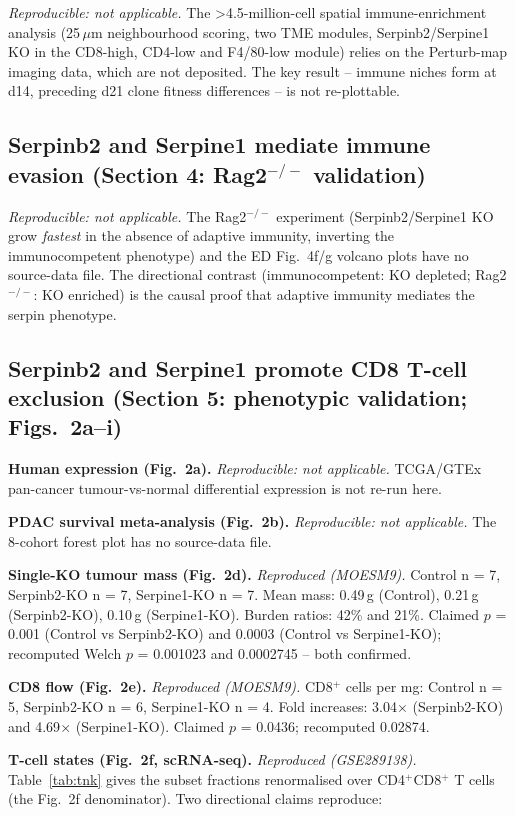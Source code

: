 \documentclass[preprint,12pt]{elsarticle}
\begin{document}
\emph{Reproducible: not applicable.} The >4.5-million-cell spatial
immune-enrichment analysis (25\,$\mu$m neighbourhood scoring, two
TME modules, Serpinb2/Serpine1 KO in the
CD8-high, CD4-low and F4/80-low module) relies on the Perturb-map
imaging data, which are not deposited. The key result -- immune
niches form at d14, preceding d21 clone fitness differences -- is
not re-plottable.

\subsection{Serpinb2 and Serpine1 mediate immune evasion
(Section 4: Rag2$^{-/-}$ validation)}

\emph{Reproducible: not applicable.} The Rag2$^{-/-}$ experiment
(Serpinb2/Serpine1 KO grow \emph{fastest} in the absence of
adaptive immunity, inverting the immunocompetent phenotype) and the
ED Fig.~4f/g volcano plots have no source-data file. The
directional contrast (immunocompetent: KO depleted;
Rag2$^{-/-}$: KO enriched) is the causal proof that adaptive
immunity mediates the serpin phenotype.

\subsection{Serpinb2 and Serpine1 promote CD8 T-cell exclusion
(Section 5: phenotypic validation; Figs.~2a--i)}

\textbf{Human expression (Fig.~2a).} \emph{Reproducible: not
applicable.} TCGA/GTEx pan-cancer tumour-vs-normal differential
expression is not re-run here.

\textbf{PDAC survival meta-analysis (Fig.~2b).} \emph{Reproducible:
not applicable.} The 8-cohort forest plot has no source-data file.

\textbf{Single-KO tumour mass (Fig.~2d).} \emph{Reproduced
(MOESM9).} Control n = 7, Serpinb2-KO n = 7, Serpine1-KO n = 7.
Mean mass: 0.49\,g (Control), 0.21\,g (Serpinb2-KO), 0.10\,g
(Serpine1-KO). Burden ratios: 42\% and 21\%. Claimed $p$ = 0.001
(Control vs Serpinb2-KO) and 0.0003 (Control vs Serpine1-KO);
recomputed Welch $p$ = 0.001023 and 0.0002745 -- both confirmed.

\textbf{CD8 flow (Fig.~2e).} \emph{Reproduced (MOESM9).} CD8$^{+}$
cells per mg: Control n = 5, Serpinb2-KO n = 6, Serpine1-KO n = 4.
Fold increases: 3.04$\times$ (Serpinb2-KO) and 4.69$\times$
(Serpine1-KO). Claimed $p$ = 0.0436; recomputed 0.02874.

\textbf{T-cell states (Fig.~2f, scRNA-seq).} \emph{Reproduced
(GSE289138).} Table~\ref{tab:tnk} gives the subset fractions
renormalised over CD4$^{+}$CD8$^{+}$ T cells (the Fig.~2f
denominator). Two directional claims reproduce:
\end{document}
